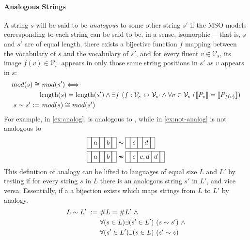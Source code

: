 \documentclass[a4paper,12pt,leqno]{article}
\newcommand{\vph}[1]{\vphantom{#1}}
\newcommand{\ebox}[1]{\fbox{$\vph{'(),}#1$}}
\newcommand{\nbBefore}[2]{\ebox{#1}\ebox{}\ebox{#2}}
\newcommand{\nbOverlaps}[2]{\ebox{#1}\ebox{#1,#2}\ebox{#2}}
\newcommand{\Before}[2]{\ebox{}\nbBefore{#1}{#2}\ebox{}}
\newcommand{\Overlaps}[2]{\ebox{}\nbOverlaps{#1}{#2}\ebox{}}
\newcommand{\V}{\mathcal{V}}
\newcommand{\nb}[1]{{\color{red}[NB\footnote{{\color{red}#1}}]}}
\begin{document}
\paragraph{Analogous Strings}\label{para:analogous-strings}
A string $s$ will be said to be \textit{analogous} to some other string $s'$ if the MSO models corresponding to each string can be said to be, in a sense, isomorphic%
---that is, $s$ and $s'$ are of equal length, there exists a bijective function $f$ mapping between the vocabulary of $s$ and the vocabulary of $s'$, and for every fluent $v \in \V_s$, its image $f(v) \in \V_{s'}$ appears in only those same string positions in $s'$ as $v$ appears in $s$:
\begin{align}\label{def:analogous-strings}
	mod(s) \cong&~ mod(s') \Longleftrightarrow \\\notag &\text{length}(s) = \text{length}(s') \land \exists f ~(f: \V_s \leftrightarrow \V_{s'} \land \forall v \in \V_s ~(\llbracket P_v \rrbracket = \llbracket P_{f(v)} \rrbracket)\\
	s \sim s' :=&~ mod(s) \cong mod(s')
\end{align}
For example, in \cref{ex:analog}, \Before{a}{b} is analogous to \Before{c}{d}, while in \cref{ex:not-analog} \Before{a}{b} is not analogous to \Overlaps{c}{d}
\begin{align}
	\Before{a}{b} &\sim \Before{c}{d}\label{ex:analog}\\
	\Before{a}{b} &\nsim \Overlaps{c}{d}\label{ex:not-analog}
\end{align}
This definition of analogy can be lifted to languages of equal size $L$ and $L'$ by testing if for every string $s$ in $L$ there is an analogous string $s'$ in $L'$, and vice versa. Essentially, if a a bijection exists which maps strings from $L$ to $L'$ by analogy.
\begin{align}\label{def:analogous-languages}
	L \sim L' ~:=~ &\# L = \#L' ~\wedge\\\notag&\forall (s \in L) \exists (s' \in L')~ (s \sim s') ~\wedge\\\notag&\forall (s' \in L') \exists (s \in L)~ (s' \sim s)
\end{align}
\end{document}
